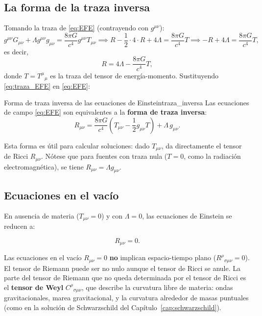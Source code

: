 \subsection{La forma de la traza inversa}

Tomando la traza de \eqref{eq:EFE} (contrayendo con $g^{\mu\nu}$):
\begin{equation}
  g^{\mu\nu}G_{\mu\nu} + \Lambda g^{\mu\nu}g_{\mu\nu} = \frac{8\pi G}{c^4}g^{\mu\nu}T_{\mu\nu}
  \implies
  R - \frac{1}{2}\cdot 4\cdot R + 4\Lambda = \frac{8\pi G}{c^4}T
  \implies
  -R + 4\Lambda = \frac{8\pi G}{c^4}T,
\end{equation}
es decir,
\begin{equation}
  R = 4\Lambda - \frac{8\pi G}{c^4}T,
  \label{eq:traza_EFE}
\end{equation}
donde $T = T^\mu{}_\mu$ es la traza del tensor de energía-momento. Sustituyendo \eqref{eq:traza_EFE} en \eqref{eq:EFE}:

\begin{proposicion}{Forma de traza inversa de las ecuaciones de Einstein}{traza_inversa}
Las ecuaciones de campo \eqref{eq:EFE} son equivalentes a la \textbf{forma de traza inversa}:
\begin{equation}
  R_{\mu\nu} = \frac{8\pi G}{c^4}\left(T_{\mu\nu} - \frac{1}{2}g_{\mu\nu}T\right) + \Lambda\,g_{\mu\nu}.
  \label{eq:EFE_traza_inversa}
\end{equation}
\end{proposicion}

Esta forma es útil para calcular soluciones: dado $T_{\mu\nu}$, da directamente el tensor de Ricci $R_{\mu\nu}$. Nótese que para fuentes con traza nula ($T = 0$, como la radiación electromagnética), se tiene $R_{\mu\nu} = \Lambda g_{\mu\nu}$.

\subsection{Ecuaciones en el vacío}

En ausencia de materia ($T_{\mu\nu} = 0$) y con $\Lambda = 0$, las ecuaciones de Einstein se reducen a:

\begin{equation}
  \boxed{R_{\mu\nu} = 0.}
  \label{eq:vacío}
\end{equation}

\begin{importante}
Las ecuaciones en el vacío $R_{\mu\nu} = 0$ \textbf{no} implican espacio-tiempo plano ($R^\rho{}_{\sigma\mu\nu} = 0$). El tensor de Riemann puede ser no nulo aunque el tensor de Ricci se anule. La parte del tensor de Riemann que no queda determinada por el tensor de Ricci es el \textbf{tensor de Weyl} $C^\rho{}_{\sigma\mu\nu}$, que describe la curvatura libre de materia: ondas gravitacionales, marea gravitacional, y la curvatura alrededor de masas puntuales (como en la solución de Schwarzschild del Capítulo~\ref{cap:schwarzschild}).
\end{importante}

